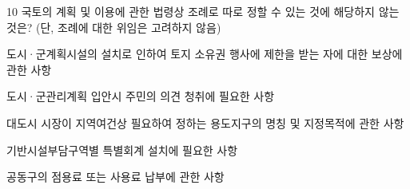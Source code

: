 \begin{question}{10}
국토의 계획 및 이용에 관한 법령상 조례로 따로 정할 수 있는 것에 해당하지 않는 것은? (단, 조례에 대한 위임은 고려하지 않음)
\begin{choices}
  \item 도시·군계획시설의 설치로 인하여 토지 소유권 행사에 제한을 받는 자에 대한 보상에 관한 사항
  \item 도시·군관리계획 입안시 주민의 의견 청취에 필요한 사항
  \item 대도시 시장이 지역여건상 필요하여 정하는 용도지구의 명칭 및 지정목적에 관한 사항
  \item 기반시설부담구역별 특별회계 설치에 필요한 사항
  \item 공동구의 점용료 또는 사용료 납부에 관한 사항
\end{choices}
\end{question}

